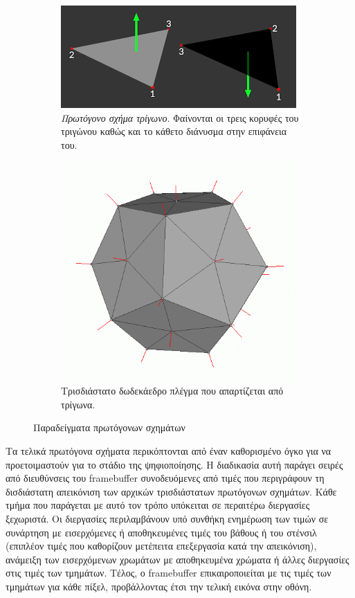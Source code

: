 \begin{figure}[h]
	\centering
	\begin{subfigure}{.4\textwidth}
		\centering
		\includegraphics[width=.4\linewidth]{images/chapter2/triangle_normal.png}
		\caption[Πρωτόγονο σχήμα τρίγωνο]{\textsl{Πρωτόγονο σχήμα τρίγωνο}. Φαίνονται οι τρεις κορυφές του τριγώνου καθώς και το κάθετο διάνυσμα στην επιφάνεια του.}
	\end{subfigure}%
	\hfill
	\begin{subfigure}{.4\textwidth}
		\centering
		\includegraphics[width=.4\linewidth]{images/appendix/vertex_normal.png}
		\caption[Τρισδιάστατο δωδεκάεδρο πλέγμα]{Τρισδιάστατο δωδεκάεδρο πλέγμα που απαρτίζεται από τρίγωνα.}
	\end{subfigure}
	\caption{Παραδείγματα πρωτόγονων σχημάτων}
	\label{figure:mesh}
\end{figure}


Τα τελικά πρωτόγονα σχήματα περικόπτονται από έναν καθορισμένο όγκο για να προετοιμαστούν για το στάδιο της ψηφιοποίησης. Η διαδικασία αυτή παράγει σειρές από διευθύνσεις του framebuffer συνοδευόμενες από τιμές που περιγράφουν τη δισδιάστατη απεικόνιση των αρχικών τρισδιάστατων πρωτόγονων σχημάτων. Κάθε τμήμα που παράγεται με αυτό τον τρόπο υπόκειται σε περαιτέρω διεργασίες ξεχωριστά. Οι διεργασίες περιλαμβάνουν υπό συνθήκη ενημέρωση των τιμών σε συνάρτηση με εισερχόμενες ή αποθηκευμένες τιμές του βάθους ή του στένσιλ (επιπλέον τιμές που καθορίζουν μετέπειτα επεξεργασία κατά την απεικόνιση), ανάμειξη των εισερχόμενων χρωμάτων με αποθηκευμένα χρώματα ή άλλες διεργασίες στις τιμές των τμημάτων. Τέλος, ο framebuffer επικαιροποιείται με τις τιμές των τμημάτων για κάθε πίξελ, προβάλλοντας έτσι την τελική εικόνα στην οθόνη.